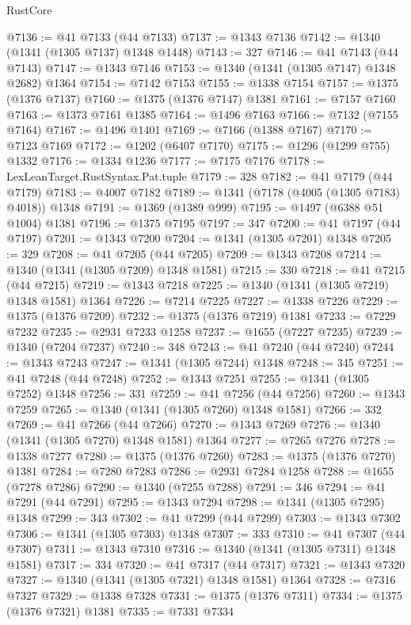 \begin{lexlean}{RustCore}
\begin{coremodule}
@7136 := @41 @7133 (@44 @7133)
@7137 := @1343 @7136
@7142 := @1340 (@1341 (@1305 @7137) @1348 @1448)
@7143 := 327
@7146 := @41 @7143 (@44 @7143)
@7147 := @1343 @7146
@7153 := @1340 (@1341 (@1305 @7147) @1348 @2682) @1364
@7154 := @7142 @7153
@7155 := @1338 @7154
@7157 := @1375 (@1376 @7137)
@7160 := @1375 (@1376 @7147) @1381
@7161 := @7157 @7160
@7163 := @1373 @7161 @1385
@7164 := @1496 @7163
@7166 := @7132 (@7155 @7164)
@7167 := @1496 @1401
@7169 := @7166 (@1388 @7167)
@7170 := @7123 @7169
@7172 := @1202 (@6407 @7170)
@7175 := @1296 (@1299 @755) @1332
@7176 := @1334 @1236
@7177 := @7175 @7176
@7178 := LexLeanTarget.RustSyntax.Pat.tuple
@7179 := 328
@7182 := @41 @7179 (@44 @7179)
@7183 := @4007 @7182
@7189 := @1341 (@7178 (@4005 (@1305 @7183) @4018)) @1348
@7191 := @1369 (@1389 @999)
@7195 := @1497 (@6388 @51 @1004) @1381
@7196 := @1375 @7195
@7197 := 347
@7200 := @41 @7197 (@44 @7197)
@7201 := @1343 @7200
@7204 := @1341 (@1305 @7201) @1348
@7205 := 329
@7208 := @41 @7205 (@44 @7205)
@7209 := @1343 @7208
@7214 := @1340 (@1341 (@1305 @7209) @1348 @1581)
@7215 := 330
@7218 := @41 @7215 (@44 @7215)
@7219 := @1343 @7218
@7225 := @1340 (@1341 (@1305 @7219) @1348 @1581) @1364
@7226 := @7214 @7225
@7227 := @1338 @7226
@7229 := @1375 (@1376 @7209)
@7232 := @1375 (@1376 @7219) @1381
@7233 := @7229 @7232
@7235 := @2931 @7233 @1258
@7237 := @1655 (@7227 @7235)
@7239 := @1340 (@7204 @7237)
@7240 := 348
@7243 := @41 @7240 (@44 @7240)
@7244 := @1343 @7243
@7247 := @1341 (@1305 @7244) @1348
@7248 := 345
@7251 := @41 @7248 (@44 @7248)
@7252 := @1343 @7251
@7255 := @1341 (@1305 @7252) @1348
@7256 := 331
@7259 := @41 @7256 (@44 @7256)
@7260 := @1343 @7259
@7265 := @1340 (@1341 (@1305 @7260) @1348 @1581)
@7266 := 332
@7269 := @41 @7266 (@44 @7266)
@7270 := @1343 @7269
@7276 := @1340 (@1341 (@1305 @7270) @1348 @1581) @1364
@7277 := @7265 @7276
@7278 := @1338 @7277
@7280 := @1375 (@1376 @7260)
@7283 := @1375 (@1376 @7270) @1381
@7284 := @7280 @7283
@7286 := @2931 @7284 @1258
@7288 := @1655 (@7278 @7286)
@7290 := @1340 (@7255 @7288)
@7291 := 346
@7294 := @41 @7291 (@44 @7291)
@7295 := @1343 @7294
@7298 := @1341 (@1305 @7295) @1348
@7299 := 343
@7302 := @41 @7299 (@44 @7299)
@7303 := @1343 @7302
@7306 := @1341 (@1305 @7303) @1348
@7307 := 333
@7310 := @41 @7307 (@44 @7307)
@7311 := @1343 @7310
@7316 := @1340 (@1341 (@1305 @7311) @1348 @1581)
@7317 := 334
@7320 := @41 @7317 (@44 @7317)
@7321 := @1343 @7320
@7327 := @1340 (@1341 (@1305 @7321) @1348 @1581) @1364
@7328 := @7316 @7327
@7329 := @1338 @7328
@7331 := @1375 (@1376 @7311)
@7334 := @1375 (@1376 @7321) @1381
@7335 := @7331 @7334

\end{coremodule}
\end{lexlean}
